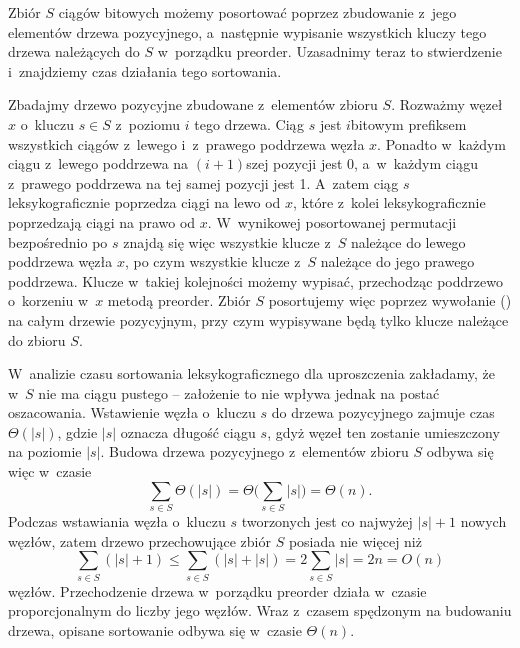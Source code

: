 
\noindent Zbiór $S$ ciągów bitowych możemy posortować poprzez zbudowanie z~jego elementów drzewa pozycyjnego, a~następnie wypisanie wszystkich kluczy tego drzewa należących do $S$ w~porządku preorder.
Uzasadnimy teraz to stwierdzenie i~znajdziemy czas działania tego sortowania.

Zbadajmy drzewo pozycyjne zbudowane z~elementów zbioru $S$.
Rozważmy węzeł $x$ o~kluczu $s\in S$ z~poziomu $i$ tego drzewa.
Ciąg $s$ jest $i$\nbhyphen bitowym prefiksem wszystkich ciągów z~lewego i~z~prawego poddrzewa węzła $x$.
Ponadto w~każdym ciągu z~lewego poddrzewa na $(i+1)$\nbhyphen szej pozycji jest 0, a~w~każdym ciągu z~prawego poddrzewa na tej samej pozycji jest 1.
A~zatem ciąg $s$ leksykograficznie poprzedza ciągi na lewo od $x$, które z~kolei leksykograficznie poprzedzają ciągi na prawo od $x$.
W~wynikowej posortowanej permutacji bezpośrednio po $s$ znajdą się więc wszystkie klucze z~$S$ należące do lewego poddrzewa węzła $x$, po czym wszystkie klucze z~$S$ należące do jego prawego poddrzewa.
Klucze w~takiej kolejności możemy wypisać, przechodząc poddrzewo o~korzeniu w~$x$ metodą preorder.
Zbiór $S$ posortujemy więc poprzez wywołanie  () na całym drzewie pozycyjnym, przy czym wypisywane będą tylko klucze należące do zbioru $S$.

W~analizie czasu sortowania leksykograficznego dla uproszczenia zakładamy, że w~$S$ nie ma ciągu pustego -- założenie to nie wpływa jednak na postać oszacowania.
Wstawienie węzła o~kluczu $s$ do drzewa pozycyjnego zajmuje czas $\Theta(|s|)$, gdzie $|s|$ oznacza długość ciągu $s$, gdyż węzeł ten zostanie umieszczony na poziomie $|s|$.
Budowa drzewa pozycyjnego z~elementów zbioru $S$ odbywa się więc w~czasie
\[
	\sum_{s\in S}\Theta(|s|) = \Theta\biggl(\sum_{s\in S}|s|\biggr) = \Theta(n).
\]
Podczas wstawiania węzła o~kluczu $s$ tworzonych jest co najwyżej $|s|+1$ nowych węzłów, zatem drzewo przechowujące zbiór $S$ posiada nie więcej niż
\[
	\sum_{s\in S}(|s|+1) \le \sum_{s\in S}(|s|+|s|) = 2\sum_{s\in S}|s| = 2n = O(n)
\]
węzłów.
Przechodzenie drzewa w~porządku preorder działa w~czasie proporcjonalnym do liczby jego węzłów.
Wraz z~czasem spędzonym na budowaniu drzewa, opisane sortowanie odbywa się w~czasie $\Theta(n)$.
